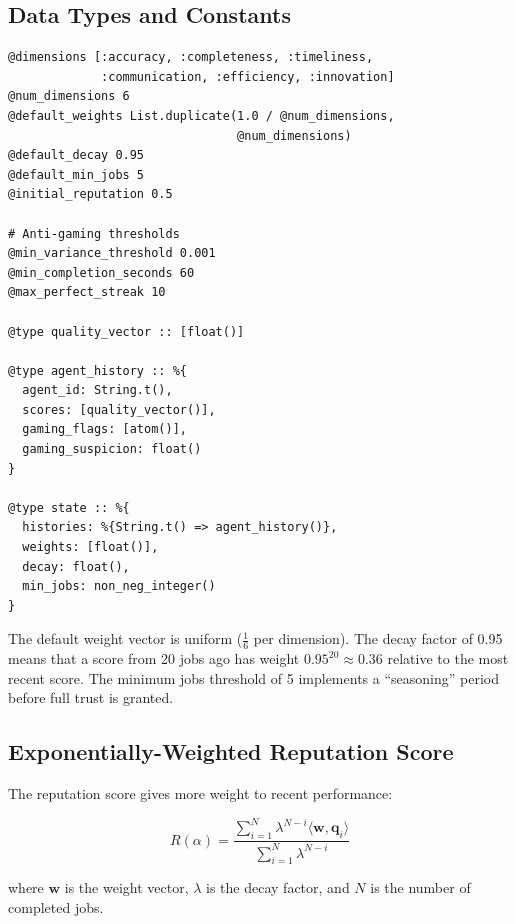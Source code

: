 \documentclass[12pt,a4paper]{article}
\theoremstyle{plain}
\theoremstyle{definition}
\begin{document}
\subsection{Data Types and Constants}

\begin{lstlisting}[caption={Reputation types and constants},label={lst:rep-types}]
@dimensions [:accuracy, :completeness, :timeliness,
             :communication, :efficiency, :innovation]
@num_dimensions 6
@default_weights List.duplicate(1.0 / @num_dimensions,
                                @num_dimensions)
@default_decay 0.95
@default_min_jobs 5
@initial_reputation 0.5

# Anti-gaming thresholds
@min_variance_threshold 0.001
@min_completion_seconds 60
@max_perfect_streak 10

@type quality_vector :: [float()]

@type agent_history :: %{
  agent_id: String.t(),
  scores: [quality_vector()],
  gaming_flags: [atom()],
  gaming_suspicion: float()
}

@type state :: %{
  histories: %{String.t() => agent_history()},
  weights: [float()],
  decay: float(),
  min_jobs: non_neg_integer()
}
\end{lstlisting}

The default weight vector is uniform ($\frac{1}{6}$ per dimension). The decay factor of 0.95 means that a score from 20 jobs ago has weight $0.95^{20} \approx 0.36$ relative to the most recent score. The minimum jobs threshold of 5 implements a ``seasoning'' period before full trust is granted.

\subsection{Exponentially-Weighted Reputation Score}

The reputation score gives more weight to recent performance:

\begin{equation}\label{eq:reputation}
    R(\alpha) = \frac{\sum_{i=1}^{N} \lambda^{N-i} \langle \mathbf{w}, \mathbf{q}_i \rangle}{\sum_{i=1}^{N} \lambda^{N-i}}
\end{equation}

where $\mathbf{w}$ is the weight vector, $\lambda$ is the decay factor, and $N$ is the number of completed jobs.
\end{document}
